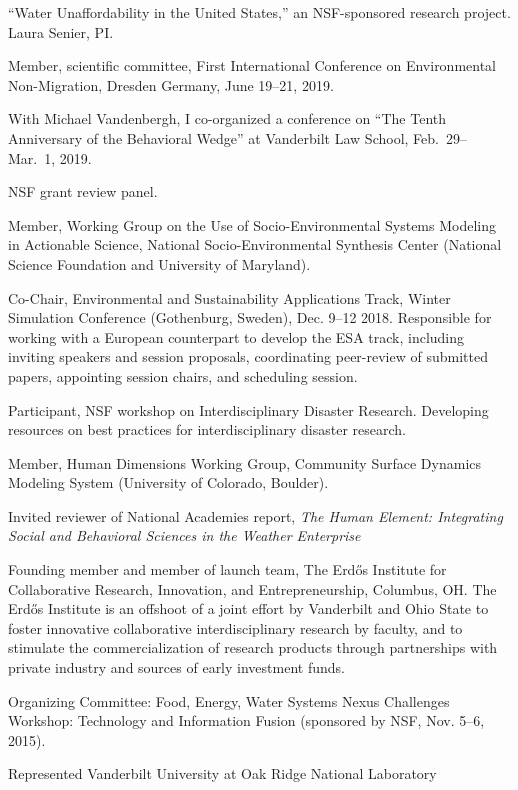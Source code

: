   ``Water Unaffordability in the United States,''
  an NSF-sponsored research project. Laura Senier, PI.
\item[2019] Member, scientific committee,
  First International Conference on Environmental Non-Migration,
  Dresden Germany, June 19--21, 2019.
\item[2019] With Michael Vandenbergh, I co-organized a conference on
  ``The Tenth Anniversary of the Behavioral Wedge'' at Vanderbilt Law School,
   Feb.~29--Mar.~1, 2019.
\item[2018] NSF grant review panel.
\item[2018] Member, Working Group on the Use of Socio-Environmental Systems
  Modeling in Actionable Science,
  National Socio-Environmental Synthesis Center
  (National Science Foundation and University of Maryland).
\item[2018] Co-Chair, Environmental and Sustainability Applications Track,
   Winter Simulation Conference (Gothenburg, Sweden), Dec. 9--12 2018.
   Responsible for working with a European counterpart to develop the ESA
   track, including inviting speakers and session proposals, coordinating
   peer-review of submitted papers, appointing session chairs, and scheduling
   session.
\item[2017--2018] Participant, NSF workshop on
  Interdisciplinary Disaster Research.
  Developing resources on best practices for interdisciplinary disaster
  research.
\item[2017--2018] Member, Human Dimensions Working Group,
  Community Surface Dynamics Modeling System (University of Colorado, Boulder).
\item[2017] Invited reviewer of National Academies report,
  \emph{The Human Element: Integrating Social and Behavioral Sciences in the
    Weather Enterprise}
\item[2017] Founding member and member of launch team,
  The Erd\H{o}s Institute for Collaborative Research, Innovation, and
  Entrepreneurship, Columbus, OH.
  The Erd\H{o}s Institute is an offshoot of a joint effort by Vanderbilt and
  Ohio State to foster innovative collaborative interdisciplinary research by
  faculty, and to stimulate the commercialization of research products through
  partnerships with private industry and sources of early investment funds.
\item[2015] Organizing Committee:
  Food, Energy, Water Systems Nexus Challenges Workshop: Technology and
  Information Fusion (sponsored by NSF, Nov. 5--6, 2015).
\item[2007] Represented Vanderbilt University at Oak Ridge National Laboratory
